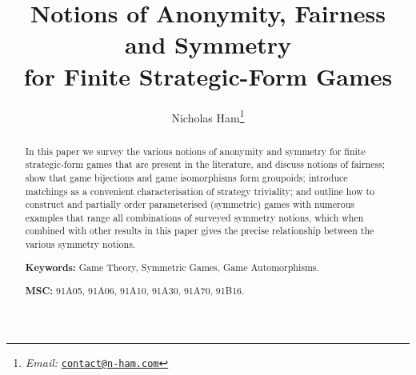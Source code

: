 \documentclass[a4paper, 11pt]{article}
\theoremstyle{paper}
\begin{document}
    \title{Notions of Anonymity, Fairness and Symmetry \\ for Finite Strategic-Form Games}
    \author{Nicholas Ham\footnote{{\it Email:} \href{mailto:contact@n-ham.com}{\tt contact@n-ham.com}}}
	\maketitle


    \begin{abstract}
    		In this paper we survey the various notions of anonymity and symmetry for finite strategic-form games that are present in the literature, and discuss notions of fairness; show that game bijections and game isomorphisms form groupoids; introduce matchings as a convenient characterisation of strategy triviality; and outline how to construct and partially order parameterised (symmetric) games with numerous examples that range all combinations of surveyed symmetry notions, which when combined with other results in this paper gives the precise relationship between the various symmetry notions.
    		
    		\textbf{Keywords:} Game Theory, Symmetric Games, Game Automorphisms.
    		
    		\textbf{MSC:} 
    		91A05, %
    		91A06, %
    		91A10, %
    		91A30, %
    		91A70, %
    		91B16. %
    \end{abstract}
    
    \tableofcontents
    
    
    
    
    
    
    
\end{document}
